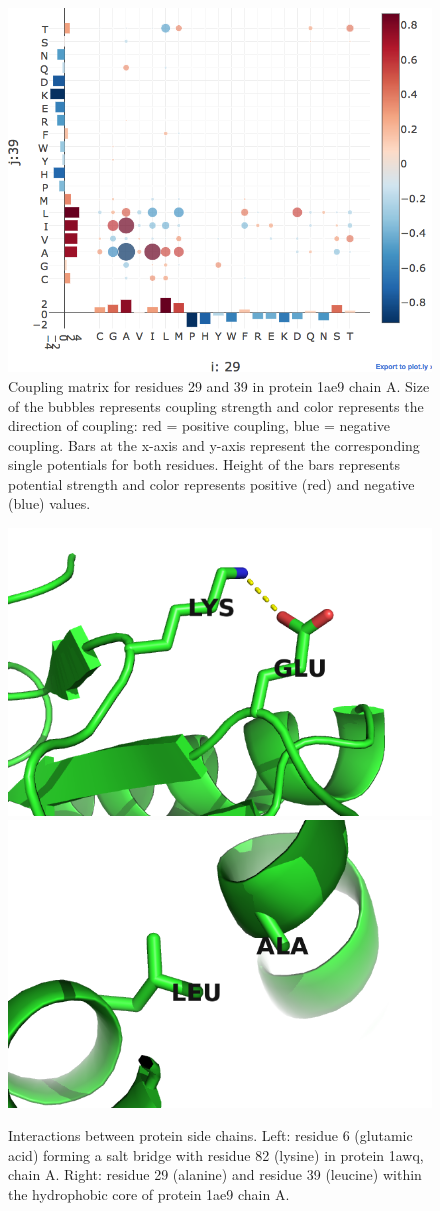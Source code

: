 \documentclass[12pt,a4paper,twoside]{book}
\theoremstyle{definition}
\theoremstyle{definition}
\theoremstyle{remark}
\begin{document}
\begin{figure}
\includegraphics[width=0.9\linewidth]{img/coupling_matrix_analysis/coupling_matrix_1ae9A00_29_39_notitle} \caption{Coupling matrix
for residues 29 and 39 in protein 1ae9 chain A. Size of the bubbles
represents coupling strength and color represents the direction of
coupling: red = positive coupling, blue = negative coupling. Bars at the
x-axis and y-axis represent the corresponding single potentials for both
residues. Height of the bars represents potential strength and color
represents positive (red) and negative (blue) values.}\label{fig:coupling-matrix-hydrophobic-interaction}
\end{figure}







\begin{figure}
\includegraphics[width=0.5\linewidth]{img/coupling_matrix_analysis/1a9xA05_6_82} \includegraphics[width=0.5\linewidth]{img/coupling_matrix_analysis/1ae9A00_29_39} \caption{Interactions between protein side
chains. Left: residue 6 (glutamic acid) forming a salt bridge with
residue 82 (lysine) in protein 1awq, chain A. Right: residue 29
(alanine) and residue 39 (leucine) within the hydrophobic core of
protein 1ae9 chain A.}\label{fig:coupling-matrix-pymol}
\end{figure}
\end{document}
